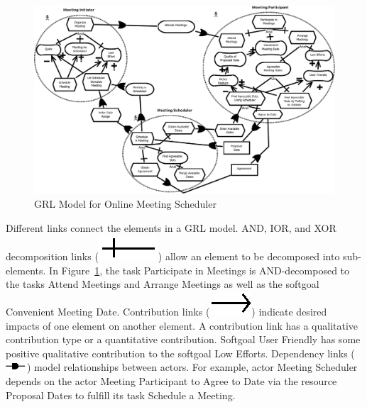 \documentclass[11.5pt,two column]{llncs}
\begin{document}
\begin{figure}[ht]
\centering
\includegraphics[scale=0.35]{img/SchedulerModel}
\caption{GRL Model for Online Meeting Scheduler}
\label{fig:SchedulerModel}
\end{figure}

Different links connect the elements in a GRL model. AND, IOR, and XOR decomposition links (\includegraphics[scale=1]{img/decomposition}) allow an element to be decomposed into sub-elements. In Figure~\ref{fig:SchedulerModel}, the task \textsf{Participate in Meetings} is AND-decomposed to the tasks \textsf{Attend Meetings} and \textsf{Arrange Meetings} as well as the softgoal \textsf{Convenient Meeting Date}. Contribution links (\includegraphics[scale=1]{img/contribution}) indicate desired impacts of one element on another element. A contribution link has a qualitative contribution type or a quantitative contribution. Softgoal \textsf{User Friendly} has \textsf{some positive} qualitative contribution to the softgoal \textsf{Low Efforts}. Dependency links (\includegraphics[scale=1]{img/dependency}) model relationships between actors. For example, actor \textsf{Meeting Scheduler} depends on the actor \textsf{Meeting Participant} to \textsf{Agree to Date} via the resource \textsf{Proposal Dates} to fulfill its task \textsf{Schedule a Meeting}.
\end{document}

